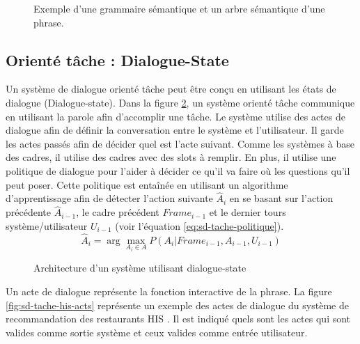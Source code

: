 \documentclass{KodeBook}
\begin{document}
\begin{figure}[!ht]
	\centering
	
	\caption{Exemple d'une grammaire sémantique et un arbre sémantique d'une phrase. \cite{2020-jurafsky-martin}}
	\label{fig:sd-tache-frame-parse}
\end{figure}

\subsection{Orienté tâche : Dialogue-State}

Un système de dialogue orienté tâche peut être conçu en utilisant les états de dialogue (Dialogue-state). 
Dans la figure \ref{fig:sd-tache-dial-state}, un système orienté tâche communique en utilisant la parole afin d'accomplir une tâche. 
Le système utilise des actes de dialogue afin de définir la conversation entre le système et l'utilisateur. 
Il garde les actes passés afin de décider quel est l'acte suivant.
Comme les systèmes à base des cadres, il utilise des cadres avec des slots à remplir. 
En plus, il utilise une politique de dialogue pour l'aider à décider ce qu'il va faire où les questions qu'il peut poser. 
Cette politique est entaînée en utilisant un algorithme d'apprentissage afin de détecter l'action suivante $ \hat{A}_i $ en se basant sur l'action précédente $\hat{A}_{i-1}$, le cadre précédent $Frame_{i-1}$ et le dernier tours système/utilisateur $ U_{i-1}$ (voir l'équation \ref{eq:sd-tache-politique}).
\begin{equation}\label{eq:sd-tache-politique}
\hat{A}_i = \arg\max_{A_i \in A} P(A_i | Frame_{i-1}, A_{i-1}, U_{i-1})
\end{equation}

\begin{figure}[!ht]
	\centering
	\caption{Architecture d'un système utilisant dialogue-state \cite{2016-williams-al}}
	\label{fig:sd-tache-dial-state}
\end{figure}

Un acte de dialogue représente la fonction interactive de la phrase. 
La figure \ref{fig:sd-tache-his-acts} représente un exemple des actes de dialogue du système de recommandation des restaurants HIS \cite{2010-young-al}. 
Il est indiqué quels sont les actes qui sont valides comme sortie système et ceux valides comme entrée utilisateur. 
\end{document}
